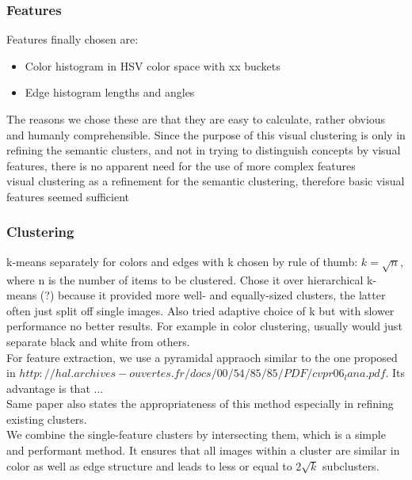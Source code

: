 \subsubsection{Features}
Features finally chosen are:
\begin{itemize}
\item{Color histogram} in HSV color space with xx  buckets
\item{Edge histogram} lengths and angles 
\end{itemize}
The reasons we chose these are that they are easy to calculate, rather obvious and humanly comprehensible. Since the purpose of this visual clustering is only in refining the semantic clusters, and not in trying to distinguish concepts by visual features, there is no apparent need for the use of more complex features \\
visual clustering as a refinement for the semantic clustering, therefore basic visual features seemed sufficient 


\subsubsection{Clustering}
k-means separately for colors and edges with k chosen by rule of thumb: $ k = \sqrt{n} $, where n is the number of items to be clustered. Chose it over hierarchical k-means (?) because it provided more well- and equally-sized clusters, the latter often just split off single images.
Also tried adaptive choice of k but with slower performance no better results. For example in color clustering, usually would just separate black and white from others.\\
For feature extraction, we use a pyramidal appraoch similar to the one proposed in  $http://hal.archives-ouvertes.fr/docs/00/54/85/85/PDF/cvpr06_lana.pdf$. Its advantage is that ... \\
Same paper also states the appropriateness of this method especially in refining existing clusters.\\
We combine the single-feature clusters by intersecting them, which is a simple and performant method. It ensures that all images within a cluster are similar in color as well as edge structure and leads to less or equal to $ 2\sqrt{k} $ subclusters.
